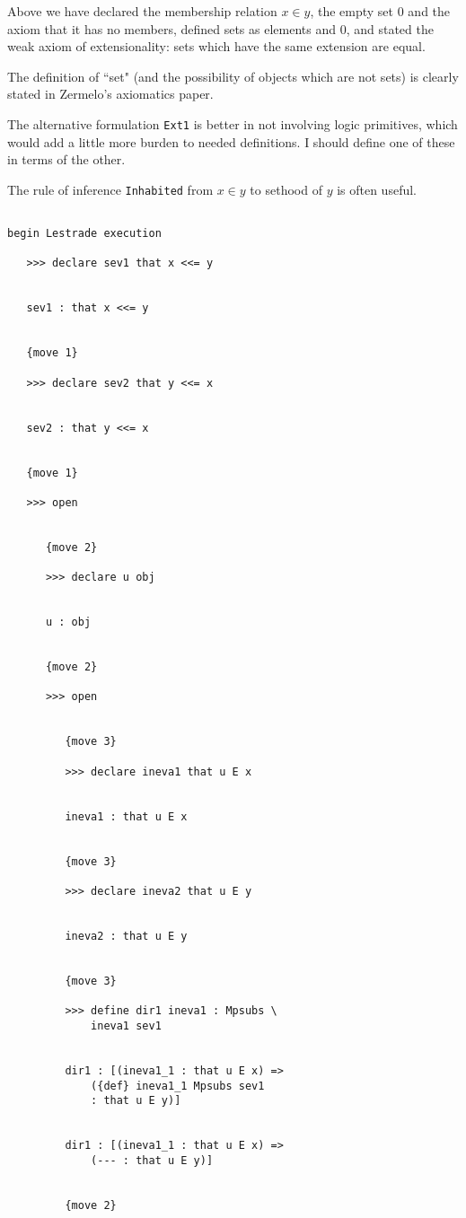 \documentclass[12pt]{article}
\begin{document}
Above we have declared the membership relation $x \in y$, the empty set 0 and the axiom that it has no members, defined sets as elements and 0, and stated the weak axiom of extensionality:  sets which have the same extension are equal.

The definition of ``set" (and the possibility of objects which are not sets) is clearly stated in Zermelo's axiomatics paper.

The alternative formulation {\tt Ext1} is better in not involving logic primitives, which would add a little more burden to needed definitions.  I should define one of these in terms of the other.

The  rule of inference {\tt Inhabited} from $x \in y$ to sethood of $y$ is often useful.

\begin{verbatim}

begin Lestrade execution

   >>> declare sev1 that x <<= y


   sev1 : that x <<= y


   {move 1}

   >>> declare sev2 that y <<= x


   sev2 : that y <<= x


   {move 1}

   >>> open


      {move 2}

      >>> declare u obj


      u : obj


      {move 2}

      >>> open


         {move 3}

         >>> declare ineva1 that u E x


         ineva1 : that u E x


         {move 3}

         >>> declare ineva2 that u E y


         ineva2 : that u E y


         {move 3}

         >>> define dir1 ineva1 : Mpsubs \
             ineva1 sev1


         dir1 : [(ineva1_1 : that u E x) => 
             ({def} ineva1_1 Mpsubs sev1 
             : that u E y)]


         dir1 : [(ineva1_1 : that u E x) => 
             (--- : that u E y)]


         {move 2}


\end{verbatim}
\end{document}
